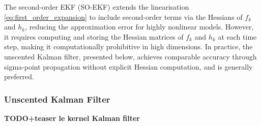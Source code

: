 The second-order EKF (SO-EKF) extends the linearisation \eqref{eq:first_order_expansion} to include second-order terms via the Hessians of $f_k$ and $h_k$, reducing the approximation error for highly nonlinear models. However, it requires computing and storing the Hessian matrices of $f_k$ and $h_k$ at each time step, making it computationally prohibitive in high dimensions. In practice, the unscented Kalman filter, presented below, achieves comparable accuracy through sigma-point propagation without explicit Hessian computation, and is generally preferred.

\subsubsection{Unscented Kalman Filter}

\textbf{TODO+teaser le kernel Kalman filter}

